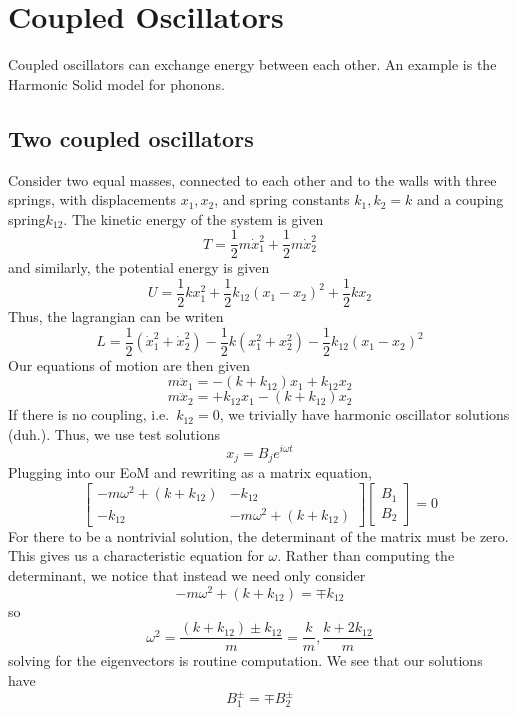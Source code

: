 \chapter{Coupled Oscillators}
Coupled oscillators can exchange energy between each other. An example is the Harmonic Solid model for phonons. 

\section{Two coupled oscillators}
Consider two equal masses, connected to each other and to the walls with three springs, with displacements \(x_1, x_2\), and spring constants \(k_1,k_2 = k\) and a couping spring\( k_{12}\). The kinetic energy of the system is given
\[T = \frac{1}{2}m \dot x_1^2+\frac{1}{2}m\dot x_2^2\]
and similarly, the potential energy is given
\[U = \frac{1}{2}k x_1^2 + \frac{1}{2}k_{12}(x_1-x_2)^2 + \frac{1}{2}k x_2\]
Thus, the lagrangian can be writen
\begin{equation}
	L = \frac{1}{2} (\dot x_1^2+\dot x_2^2)-\frac{1}{2}k(x_1^2+x_2^2)-\frac{1}{2}k_{12}(x_1-x_2)^2
\end{equation}
Our equations of motion are then given
\[m\ddot x_1 = -(k+k_{12})x_1+k_{12}x_2\]
\[m\ddot x_2 = +k_{12}x_1-(k+k_{12})x_2\]
If there is no coupling, i.e.\ \(k_{12}=0\), we trivially have harmonic oscillator solutions (duh.). Thus, we use test solutions
\[x_j = B_j e^{i\omega t}\]
Plugging into our EoM and rewriting as a matrix equation,
\[ \begin{bmatrix}
	-m\omega^2+(k+k_{12}) & -k_{12}\\
	-k_{12} & -m\omega^2+ (k+k_{12})
\end{bmatrix} \begin{bmatrix}
	B_1\\
	B_2
\end{bmatrix}=0\]
For there to be a nontrivial solution, the determinant of the matrix must be zero. This gives us a characteristic equation for \(\omega\). Rather than computing the determinant, we notice that instead we need only consider
\[-m\omega^2+(k+k_{12}) = \mp k_{12}\]
so
\begin{equation}
	\omega^2 = \frac{(k+k_{12})\pm k_{12}}{m} = \frac{k}{m},\frac{k+2k_{12}}{m}
\end{equation}
solving for the eigenvectors is routine computation. We see that our solutions have 
\begin{equation}
	B_1^\pm = \mp B_2^{\pm}
\end{equation}

